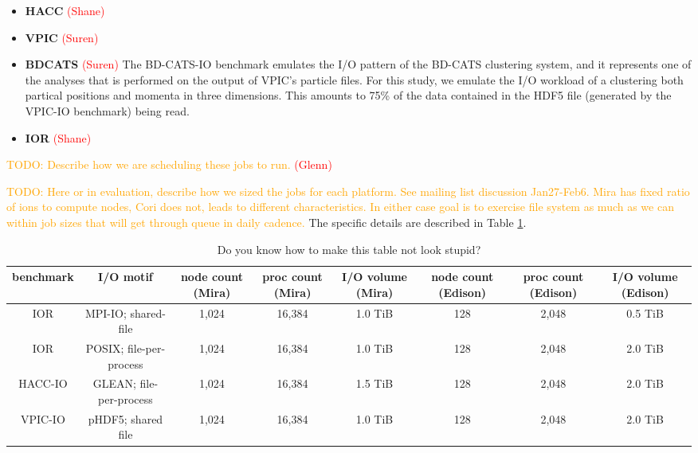 \documentclass[conference,10pt,compsocconf]{IEEEtran}
\newcommand{\assign}[1]{\textcolor{red}{(#1)}}
\newcommand{\todo}[1]{\textcolor{Orange}{TODO: #1}}
\begin{document}
\begin{itemize}
\item \textbf{HACC} \assign{Shane}
\item \textbf{VPIC} \assign{Suren} \cite{Bowers2008}
\item \textbf{BDCATS} \assign{Suren} The BD-CATS-IO benchmark emulates the I/O
pattern of the BD-CATS clustering system\cite{Patwary2015}, and it represents
one of the analyses that is performed on the output of VPIC's particle files.
For this study, we emulate the I/O workload of a clustering both partical
positions and momenta in three dimensions.  This amounts to 75\% of the data
contained in the HDF5 file (generated by the VPIC-IO benchmark) being read.
\item \textbf{IOR} \assign{Shane}
\end{itemize}

\todo{Describe how we are scheduling these jobs to run.} \assign{Glenn}

\todo{Here or in evaluation, describe how we sized the jobs for each
platform.  See mailing list discussion Jan27-Feb6.  Mira has fixed ratio of
ions to compute nodes, Cori does not, leads to different characteristics.  In
either case goal is to exercise file system as much as we can within job
sizes that will get through queue in daily cadence.}  The specific details are
described in Table \ref{tab:mira-bench-config}.

\begin{table}[h]
\centering
\begin{tabular}{|c|c|c|c|c|c|c|c|}
\hline
benchmark & I/O motif & node count (Mira) & proc count (Mira) & I/O volume (Mira) & node count (Edison) & proc count (Edison) & I/O volume (Edison) \\
\hline
IOR & MPI-IO; shared-file & 1,024 & 16,384 & 1.0 TiB & 128 & 2,048 & 0.5 TiB \\
\hline
IOR & POSIX; file-per-process & 1,024 & 16,384 & 1.0 TiB & 128 & 2,048 & 2.0 TiB \\
\hline
HACC-IO & GLEAN; file-per-process & 1,024 & 16,384 & 1.5 TiB & 128 & 2,048 & 2.0 TiB \\
\hline
VPIC-IO & pHDF5; shared file & 1,024 & 16,384 & 1.0 TiB & 128 & 2,048 & 2.0 TiB \\
\hline
\end{tabular}
\caption{Do you know how to make this table not look stupid?}
\label{tab:mira-bench-config}
\end{table}
\end{document}
